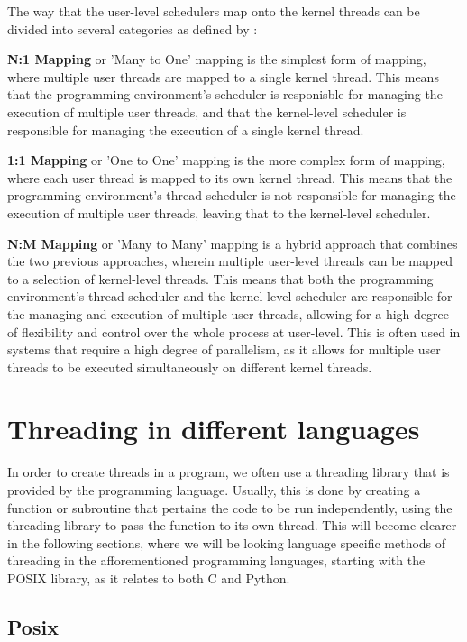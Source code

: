 \documentclass[12pt,a4paper]{article}
\begin{document}
The way that the user-level schedulers map onto the kernel threads can be divided into several categories as defined by \citeauthor[pp. 155-156]{Rauber2023}:

\textbf{N:1 Mapping} or 'Many to One' mapping is the simplest form of mapping, where multiple user threads are mapped to a single kernel thread. This means that the programming environment's scheduler is responisble for managing the execution of multiple user threads, and that the kernel-level scheduler is responsible for managing the execution of a single kernel thread.

\textbf{1:1 Mapping} or 'One to One' mapping is the more complex form of mapping, where each user thread is mapped to its own kernel thread. This means that the programming environment's thread scheduler is not responsible for managing the execution of multiple user threads, leaving that to the kernel-level scheduler.

\textbf{N:M Mapping} or 'Many to Many' mapping is a hybrid approach that combines the two previous approaches, wherein multiple user-level threads can be mapped to a selection of kernel-level threads. This means that both the programming environment's thread scheduler and the kernel-level scheduler are responsible for the managing and execution of multiple user threads, allowing for a high degree of flexibility and control over the whole process at user-level. This is often used in systems that require a high degree of parallelism, as it allows for multiple user threads to be executed simultaneously on different kernel threads.

\section{Threading in different languages}

In order to create threads in a program, we often use a threading library that is provided by the programming language. Usually, this is done by creating a function or subroutine that pertains the code to be run independently, using the threading library to pass the function to its own thread. This will become clearer in the following sections, where we will be looking language specific methods of threading in the afforementioned programming languages, starting with the POSIX library, as it relates to both C and Python.

\subsection{Posix}
\end{document}
